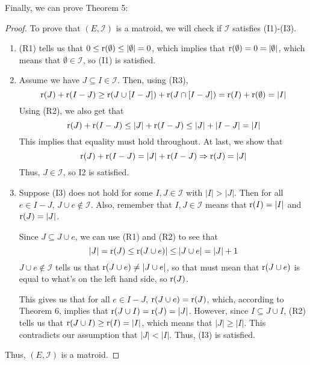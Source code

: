 Finally, we can prove Theorem 5:
\begin{proof}
    To prove that $(E,\mathcal{I})$ is a matroid, we will check if $\mathcal{I}$ satisfies (I1)-(I3).
    \begin{enumerate}
        \item (R1) tells us that $0\leq\operatorname{r}(\emptyset)\leq|\emptyset|=0$, which implies that $\operatorname{r}(\emptyset)=0=|\emptyset|$, which means that $\emptyset\in\mathcal{I}$, so (I1) is satisfied.
        \item Assume we have $J\subseteq I\in\mathcal{I}$. Then, using (R3),
        $$ \operatorname{r}(J)+\operatorname{r}(I-J) \geq \operatorname{r}(J\cup[I-J])+\operatorname{r}(J\cap[I-J]) = \operatorname{r}(I)+\operatorname{r}(\emptyset)=|I| $$
        Using (R2), we also get that
        $$ \operatorname{r}(J)+\operatorname{r}(I-J) \leq |J|+\operatorname{r}(I-J) \leq |J|+|I-J| = |I| $$
        This implies that equality must hold throughout. At last, we show that
        $$ \operatorname{r}(J)+\operatorname{r}(I-J) = |J|+\operatorname{r}(I-J) \Rightarrow \operatorname{r}(J)=|J| $$
        Thus, $J\in\mathcal{I}$, so {I2} is satisfied.
        
        \item Suppose (I3) does not hold for some $I,J\in\mathcal{I}$ with $|I|>|J|$. Then for all $e\in I-J$, $J\cup e\notin \mathcal{I}$. Also, remember that $I,J\in\mathcal{I}$ means that $\operatorname{r}(I)=|I|$ and $\operatorname{r}(J)=|J|$.

        Since $J\subseteq J\cup e$, we can use (R1) and (R2) to see that
        $$ |J|=\operatorname{r}(J)\leq\operatorname{r}(J\cup e)|\leq|J\cup e|=|J|+1 $$
        $J\cup e\notin \mathcal{I}$ tells us that $\operatorname{r}(J\cup e)\neq|J\cup e|$, so that must mean that $\operatorname{r}(J\cup e)$ is equal to what's on the left hand side, so $\operatorname{r}(J)$.

        This gives us that for all $e\in I-J$, $\operatorname{r}(J\cup e)=\operatorname{r}(J)$, which, according to Theorem 6, implies that $\operatorname{r}(J\cup I)=\operatorname{r}(J)=|J|$. However, since $I\subseteq J\cup I$, (R2) tells us that $\operatorname{r}(J\cup I) \geq \operatorname{r}(I) = |I|$, which means that $|J|\geq|I|$. This contradicts our assumption that $|J|<|I|$. Thus, (I3) is satisfied.
    \end{enumerate}
    Thus, $(E,\mathcal{I})$ is a matroid.
\end{proof}

